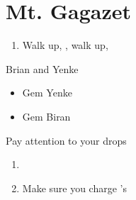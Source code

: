 \chapter{Mt. Gagazet}
\begin{enumerate}
	\item Walk up, \cs[3:40], walk up, \sd
\end{enumerate}
\begin{battle}{Brian and Yenke}
\begin{itemize}
	\kimahrif Steal from Biran
	\item Gem Yenke
	\item Gem Biran
\end{itemize}
Pay attention to your drops
\end{battle}
\begin{enumerate}[resume]
	\item \formation{\tidus}{\kimahri}{\wakka}
	\item Make sure you charge \rikku's \od
\end{enumerate}
